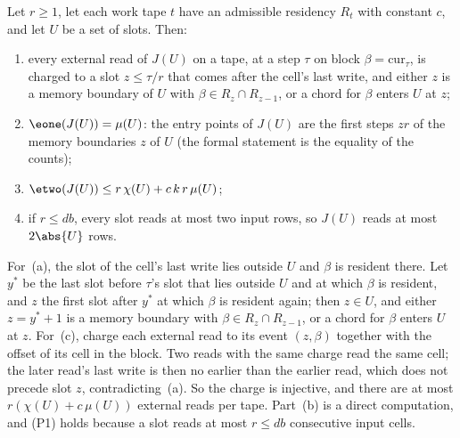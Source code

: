 \begin{lemma}[Charging]\label{lem:charging}
Let $r\ge1$, let each work tape $t$ have an admissible residency $R_t$ with constant $c$, and let
$U$ be a set of slots. Then:
\begin{enumerate}[label=(\alph*)]
\item every external read of $J(U)$ on a tape, at a step $\tau$ on block $\beta=\mathrm{cur}_\tau$,
is charged to a slot $z\le\tau/r$ that comes after the cell's last write, and either $z$ is a
memory boundary of $U$ with $\beta\in R_z\cap R_{z-1}$, or a chord for $\beta$ enters $U$ at $z$;
\item $\eone(J(U))=\mu(U)$: the entry points of $J(U)$ are the first steps $zr$ of the memory boundaries $z$
of $U$ (the formal statement is the equality of the counts);
\item $\etwo(J(U))\le r\,\chi(U)+c\,k\,r\,\mu(U)$;
\item[(P1)] if $r\le db$, every slot reads at most two input rows, so $J(U)$ reads at most
$2\abs{U}$ rows.
\end{enumerate}
\end{lemma}

\begin{outline}
For~(a), the slot of the cell's last write lies outside $U$ and $\beta$ is resident there. Let
$y^*$ be the last slot before $\tau$'s slot that lies outside $U$ and at which $\beta$ is
resident, and $z$ the first slot after $y^*$ at which $\beta$ is resident again; then $z\in U$,
and either $z=y^*+1$ is a memory boundary with $\beta\in R_z\cap R_{z-1}$, or a chord for $\beta$
enters $U$ at $z$. For~(c), charge each external read to its event $(z,\beta)$ together with the
offset of its cell in the block. Two reads with the same charge read the same cell; the later
read's last write is then no earlier than the earlier read, which does not precede slot $z$,
contradicting~(a). So the charge is injective, and there are at most $r(\chi(U)+c\,\mu(U))$ external reads per tape. Part~(b) is a
direct computation, and (P1) holds because a slot reads at most $r\le db$ consecutive input
cells.
\end{outline}

